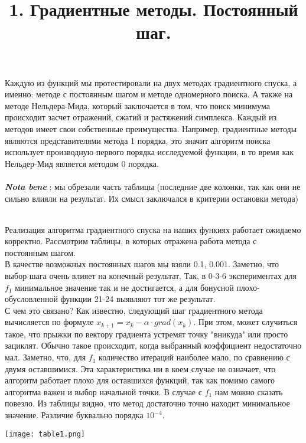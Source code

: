 \documentclass[12pt]{article}
\begin{document}
Каждую из функций мы протестировали на двух методах градиентного спуска, а именно: методе с постоянным шагом и методе одномерного поиска. А также на методе Нельдера-Мида, который заключается в том, что поиск минимума происходит засчет отражений, сжатий и растяжений симплекса. Каждый из методов имеет свои собственные преимущества. Например, градиентные методы являются представителями метода 1 порядка, это значит алгоритм поиска использует производную первого порядка исследуемой функции, в то время как Нельдер-Мид является методом 0 порядка. 
\\\\
\textbf{\textit{Nota bene}} : мы обрезали часть таблицы (последние две колонки, так как они не сильно влияли на результат. Их смысл заключался в критерии остановки метода)\\\\
\title{\textbf{1.  Градиентные методы. Постоянный шаг.}} Реализация алгоритма градиентного спуска на наших функиях работает ожидаемо корректно. Рассмотрим таблицы, в которых отражена работа метода с постоянным шагом. \\
В качестве возможных постоянных шагов мы взяли 0.1, 0.001. Заметно, что выбор шага очень влияет на конечный результат. Так, в 0-3-6 экспериментах для $f_{1}$ минимальное значение так и не достигается, а для бонусной плохо-обусловленной функции 21-24 выявляют тот же результат.\\ С чем это связано? Как известно, следующий шаг градиентного метода вычисляется по формуле $x_{k+1} = x_{k} - \alpha \cdot grad(x_{k}) $. При этом, может случиться такое, что прыжки по вектору градиента устремят точку "вникуда" или просто зациклят. Обычно такое происходит, когда выбранный коэффициент недостаточно мал. Заметно, что, для $f_{1}$ количество итераций наиболее мало, по сравнению с двумя оставшимися. Эта характеристика ни в коем случае не означает, что алгоритм работает плохо для оставшихся функций, так как помимо самого алгоритма важен и выбор начальной точки. В случае с $f_{1}$ нам можно сказать повезло. Из таблицы видно, что метод достаточно точно находит минимальное значение. Различие буквально порядка $10^{-4}$.
\begin{center}

\centering

\texttt{[image: table1.png]}


\label{fig:mpr}

\end{center}
\end{document}
